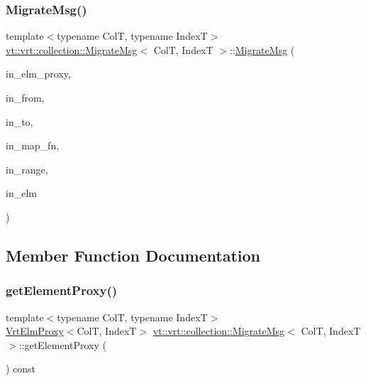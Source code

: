 \subsubsection{\texorpdfstring{Migrate\+Msg()}{MigrateMsg()}\hspace{0.1cm}{\footnotesize\ttfamily [2/2]}}
{\footnotesize\ttfamily template$<$typename ColT, typename IndexT$>$ \\
\hyperlink{structvt_1_1vrt_1_1collection_1_1_migrate_msg}{vt\+::vrt\+::collection\+::\+Migrate\+Msg}$<$ ColT, IndexT $>$\+::\hyperlink{structvt_1_1vrt_1_1collection_1_1_migrate_msg}{Migrate\+Msg} (\begin{DoxyParamCaption}\item[{\hyperlink{structvt_1_1vrt_1_1collection_1_1_vrt_elm_proxy}{Vrt\+Elm\+Proxy}$<$ ColT, IndexT $>$ const \&}]{in\+\_\+elm\+\_\+proxy,  }\item[{\hyperlink{namespacevt_a866da9d0efc19c0a1ce79e9e492f47e2}{Node\+Type} const \&}]{in\+\_\+from,  }\item[{\hyperlink{namespacevt_a866da9d0efc19c0a1ce79e9e492f47e2}{Node\+Type} const \&}]{in\+\_\+to,  }\item[{\hyperlink{namespacevt_af64846b57dfcaf104da3ef6967917573}{Handler\+Type} const}]{in\+\_\+map\+\_\+fn,  }\item[{IndexT const \&}]{in\+\_\+range,  }\item[{ColT $\ast$}]{in\+\_\+elm }\end{DoxyParamCaption})\hspace{0.3cm}{\ttfamily [inline]}}



\subsection{Member Function Documentation}
\mbox{\label{structvt_1_1vrt_1_1collection_1_1_migrate_msg_a6a8d4f819ebe556df1f3533bfa0e21f2}} 
\subsubsection{\texorpdfstring{get\+Element\+Proxy()}{getElementProxy()}}
{\footnotesize\ttfamily template$<$typename ColT, typename IndexT$>$ \\
\hyperlink{structvt_1_1vrt_1_1collection_1_1_vrt_elm_proxy}{Vrt\+Elm\+Proxy}$<$ColT, IndexT$>$ \hyperlink{structvt_1_1vrt_1_1collection_1_1_migrate_msg}{vt\+::vrt\+::collection\+::\+Migrate\+Msg}$<$ ColT, IndexT $>$\+::get\+Element\+Proxy (\begin{DoxyParamCaption}{ }\end{DoxyParamCaption}) const\hspace{0.3cm}{\ttfamily [inline]}}


